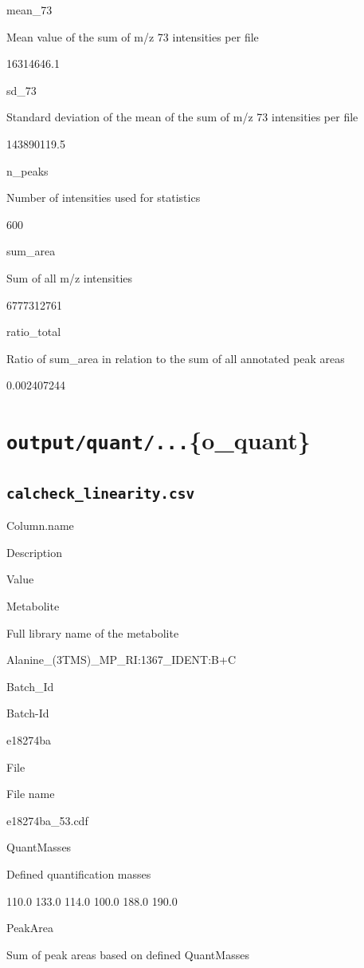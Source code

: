\documentclass[]{book}
\theoremstyle{definition}
\theoremstyle{definition}
\theoremstyle{definition}
\theoremstyle{remark}
\begin{document}
mean\_73

Mean value of the sum of m/z 73 intensities per file

16314646.1

sd\_73

Standard deviation of the mean of the sum of m/z 73 intensities per file

143890119.5

n\_peaks

Number of intensities used for statistics

600

sum\_area

Sum of all m/z intensities

6777312761

ratio\_total

Ratio of sum\_area in relation to the sum of all annotated peak areas

0.002407244

\section{\texorpdfstring{\texttt{output/quant/...}\{o\_quant\}}{output/quant/...\{o\_quant\}}}\label{outputquant...o_quant}

\subsection{\texorpdfstring{\texttt{calcheck\_linearity.csv}}{calcheck\_linearity.csv}}\label{calcheck_linearity.csv}

Column.name

Description

Value

Metabolite

Full library name of the metabolite

Alanine\_(3TMS)\_MP\_RI:1367\_IDENT:B+C

Batch\_Id

Batch-Id

e18274ba

File

File name

e18274ba\_53.cdf

QuantMasses

Defined quantification masses

110.0 133.0 114.0 100.0 188.0 190.0

PeakArea

Sum of peak areas based on defined QuantMasses
\end{document}
